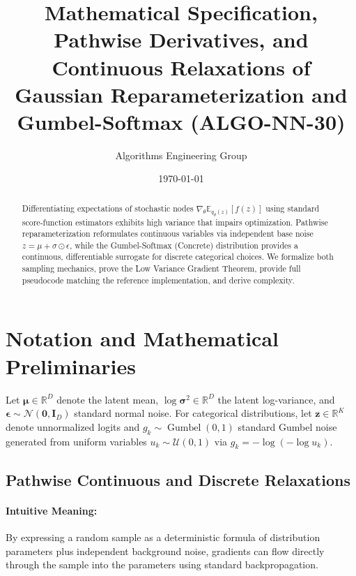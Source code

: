 \documentclass[11pt]{article}
\title{\textbf{Mathematical Specification, Pathwise Derivatives, and Continuous Relaxations of Gaussian Reparameterization and Gumbel-Softmax (ALGO-NN-30)}}
\author{Algorithms Engineering Group}
\date{\today}
\begin{document}
\maketitle

\begin{abstract}
Differentiating expectations of stochastic nodes $\nabla_\theta \mathbb{E}_{q_\theta(z)}[f(z)]$ using standard score-function estimators exhibits high variance that impairs optimization. Pathwise reparameterization reformulates continuous variables via independent base noise $z = \mu + \sigma \odot \epsilon$, while the Gumbel-Softmax (Concrete) distribution provides a continuous, differentiable surrogate for discrete categorical choices. We formalize both sampling mechanics, prove the Low Variance Gradient Theorem, provide full pseudocode matching the reference implementation, and derive complexity.
\end{abstract}

\section{Notation and Mathematical Preliminaries}
\label{sec:notation}

Let $\boldsymbol{\mu} \in \mathbb{R}^D$ denote the latent mean, $\log\boldsymbol{\sigma}^2 \in \mathbb{R}^D$ the latent log-variance, and $\boldsymbol{\epsilon} \sim \mathcal{N}(\mathbf{0}, \mathbf{I}_D)$ standard normal noise. For categorical distributions, let $\mathbf{z} \in \mathbb{R}^K$ denote unnormalized logits and $g_k \sim \operatorname{Gumbel}(0, 1)$ standard Gumbel noise generated from uniform variables $u_k \sim \mathcal{U}(0, 1)$ via $g_k = -\log(-\log u_k)$.

\subsection{Pathwise Continuous and Discrete Relaxations}
\paragraph{Intuitive Meaning:} By expressing a random sample as a deterministic formula of distribution parameters plus independent background noise, gradients can flow directly through the sample into the parameters using standard backpropagation.
\end{document}
